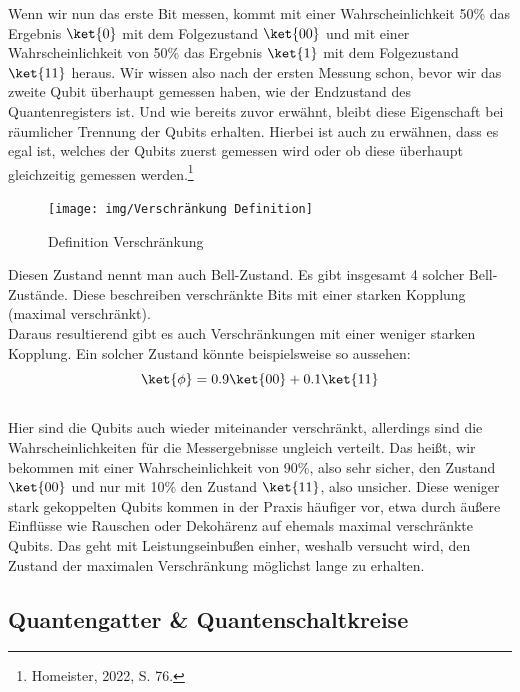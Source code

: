 Wenn wir nun das erste Bit messen, kommt mit einer Wahrscheinlichkeit 50\% das Ergebnis $\ket{0}$ mit dem Folgezustand $\ket{00}$ und mit einer Wahrscheinlichkeit von 50\% das Ergebnis $\ket{1}$ mit dem Folgezustand $\ket{11}$ heraus.
Wir wissen also nach der ersten Messung schon, bevor wir das zweite Qubit überhaupt gemessen haben, wie der Endzustand des Quantenregisters ist.
Und wie bereits zuvor erwähnt, bleibt diese Eigenschaft bei räumlicher Trennung der Qubits erhalten.
Hierbei ist auch zu erwähnen, dass es egal ist, welches der Qubits zuerst gemessen wird oder ob diese überhaupt gleichzeitig gemessen werden.\footnote{Homeister, 2022, S. 76.}\\
\begin{figure}[H]
    \centering
    \texttt{[image: img/Verschränkung Definition]}
    \caption{Definition Verschränkung}
    \label{fig:verschraenkung}
\end{figure}

Diesen Zustand nennt man auch Bell-Zustand.
Es gibt insgesamt 4 solcher Bell-Zustände.
Diese beschreiben verschränkte Bits mit einer starken Kopplung (maximal verschränkt).\\
Daraus resultierend gibt es auch Verschränkungen mit einer weniger starken Kopplung.
Ein solcher Zustand könnte beispielsweise so aussehen:\\
\begin{equation}
    \ket{\phi} = 0.9\ket{00} + 0.1\ket{11}
\end{equation}\\

Hier sind die Qubits auch wieder miteinander verschränkt, allerdings sind die Wahrscheinlichkeiten für die Messergebnisse ungleich verteilt.
Das heißt, wir bekommen mit einer Wahrscheinlichkeit von 90\%, also sehr sicher, den Zustand $\ket{00}$ und nur mit 10\% den Zustand $\ket{11}$, also unsicher.
Diese weniger stark gekoppelten Qubits kommen in der Praxis häufiger vor, etwa durch äußere Einflüsse wie Rauschen oder Dekohärenz auf ehemals maximal verschränkte Qubits.
Das geht mit Leistungseinbußen einher, weshalb versucht wird, den Zustand der maximalen Verschränkung möglichst lange zu erhalten.\\


\subsection{Quantengatter \& Quantenschaltkreise}
\label{subsec:quantengatter-quantenschaltkreise}

